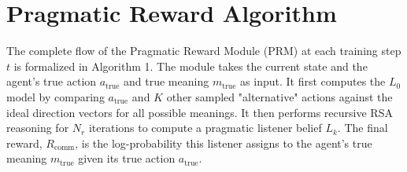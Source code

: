 \documentclass[12pt, a4paper]{report}
\newcommand{\Rcomm}{R_{\text{comm}}}
\begin{document}
\section{Pragmatic Reward Algorithm}
The complete flow of the Pragmatic Reward Module (PRM) at each training step $t$ is formalized in Algorithm 1. The module takes the current state and the agent's true action $a_{\text{true}}$ and true meaning $m_{\text{true}}$ as input. It first computes the $L_0$ model by comparing $a_{\text{true}}$ and $K$ other sampled "alternative" actions against the ideal direction vectors for all possible meanings. It then performs recursive RSA reasoning for $N_r$ iterations to compute a pragmatic listener belief $L_k$. The final reward, $\Rcomm$, is the log-probability this listener assigns to the agent's true meaning $m_{\text{true}}$ given its true action $a_{\text{true}}$.

\hspace{}
\end{document}
